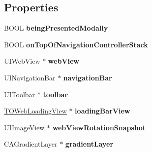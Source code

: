 \subsection*{Properties}
\begin{DoxyCompactItemize}
\item 
\hypertarget{category_t_o_web_view_controller_07_08_a03d09a016c8f69ae070ffbd173142e2c}{}B\+O\+O\+L {\bfseries being\+Presented\+Modally}\label{category_t_o_web_view_controller_07_08_a03d09a016c8f69ae070ffbd173142e2c}

\item 
\hypertarget{category_t_o_web_view_controller_07_08_af7a9f3730f63281dae0ddf7b58f9f51b}{}B\+O\+O\+L {\bfseries on\+Top\+Of\+Navigation\+Controller\+Stack}\label{category_t_o_web_view_controller_07_08_af7a9f3730f63281dae0ddf7b58f9f51b}

\item 
\hypertarget{category_t_o_web_view_controller_07_08_aad8a90e63da2674283e4d74e54d7b991}{}U\+I\+Web\+View $\ast$ {\bfseries web\+View}\label{category_t_o_web_view_controller_07_08_aad8a90e63da2674283e4d74e54d7b991}

\item 
\hypertarget{category_t_o_web_view_controller_07_08_a77617ac9b186d2b6282de00bb70a725c}{}U\+I\+Navigation\+Bar $\ast$ {\bfseries navigation\+Bar}\label{category_t_o_web_view_controller_07_08_a77617ac9b186d2b6282de00bb70a725c}

\item 
\hypertarget{category_t_o_web_view_controller_07_08_af6987ab190ac8a30cf17ed6a0224cf67}{}U\+I\+Toolbar $\ast$ {\bfseries toolbar}\label{category_t_o_web_view_controller_07_08_af6987ab190ac8a30cf17ed6a0224cf67}

\item 
\hypertarget{category_t_o_web_view_controller_07_08_a7f377d5068de6fa7dbe029b7b42be555}{}\hyperlink{interface_t_o_web_loading_view}{T\+O\+Web\+Loading\+View} $\ast$ {\bfseries loading\+Bar\+View}\label{category_t_o_web_view_controller_07_08_a7f377d5068de6fa7dbe029b7b42be555}

\item 
\hypertarget{category_t_o_web_view_controller_07_08_a9fc75524f6782ba4ae0c1b210c7225a6}{}U\+I\+Image\+View $\ast$ {\bfseries web\+View\+Rotation\+Snapshot}\label{category_t_o_web_view_controller_07_08_a9fc75524f6782ba4ae0c1b210c7225a6}

\item 
\hypertarget{category_t_o_web_view_controller_07_08_a941cabb886a6ebc810b3b21d8e86dd5e}{}C\+A\+Gradient\+Layer $\ast$ {\bfseries gradient\+Layer}\label{category_t_o_web_view_controller_07_08_a941cabb886a6ebc810b3b21d8e86dd5e}


\end{DoxyCompactItemize}
